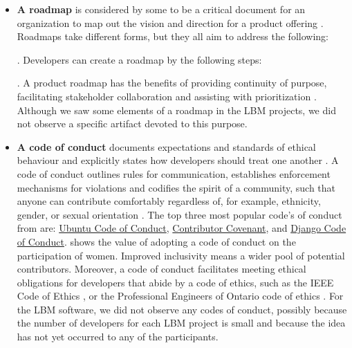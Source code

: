 \documentclass[final, 3p, times, authoryear]{elsarticle}
\begin{document}
\begin{itemize}

\item \textbf{A roadmap} is considered by some to be a critical document for an
organization to map out the vision and direction for a product offering
\citep{MunchEtAl2019}.  Roadmaps take different forms, but they all aim to
address the following:  \citep{PhaalEtAl2005}.
Developers can create a roadmap by the following steps:
 \citep{VahaniittyEtAl2002}.  A product
roadmap has the benefits of providing continuity of purpose, facilitating
stakeholder collaboration and assisting with prioritization \citep{Pichler2012}.
Although we saw some elements of a roadmap in the LBM projects, we did not
observe a specific artifact devoted to this purpose.

\item \textbf{A code of conduct} documents expectations and standards of ethical
behaviour and explicitly states how developers should treat one another
\citep{TouraniEtAl2017}. A code of conduct outlines rules for communication,
establishes enforcement mechanisms for violations and codifies the spirit of a
community, such that anyone can contribute comfortably regardless of, for
example, ethnicity, gender, or sexual orientation \citep{TouraniEtAl2017}. The
top three most popular code's of conduct from \citet{TouraniEtAl2017} are:
\href{https://ubuntu.com/community/code-of-conduct} {Ubuntu Code of Conduct},
\href{https://www.contributor-covenant.org/version/2/1/code_of_conduct/}
{Contributor Covenant}, and \href{https://www.djangoproject.com/conduct/} {Django
Code of Conduct}. \citet{SinghEtAl2021} shows the value of adopting a code of
conduct on the participation of women. Improved inclusivity means a wider pool
of potential contributors. Moreover, a code of conduct facilitates meeting
ethical obligations for developers that abide by a code of ethics, such as the
IEEE Code of Ethics \citep{IEEE1999}, or the Professional Engineers of Ontario
code of ethics \citep[p.\ 23--24]{PEO2021}. For the LBM software, we did not
observe any codes of conduct, possibly because the number of developers for each
LBM project is small and because the idea has not yet occurred to any of the
participants.


\end{itemize}
\end{document}
